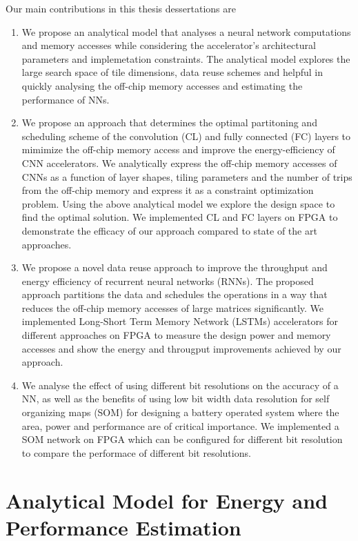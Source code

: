 \documentclass[a4paper,10pt]{article}
\begin{document}
Our main contributions in this thesis dessertations are
\begin{enumerate}
	\item We propose an analytical model that analyses a neural network computations and memory accesses while considering the accelerator's architectural parameters and implemetation constraints. The analytical model explores the large search space of tile dimensions, data reuse schemes and helpful in quickly analysing the off-chip memory accesses and estimating the performance of NNs.
	
	\item We propose an approach that determines the optimal partitoning and scheduling scheme of the convolution (CL) and fully connected (FC) layers to mimimize the off-chip memory access and improve the energy-efficiency of CNN accelerators. We analytically express the off-chip memory accesses of CNNs  as a function of layer shapes, tiling parameters and the number of trips from the off-chip memory and express it as a constraint optimization problem. Using the above analytical model we explore the design space to find the optimal solution. We implemented CL and FC layers on FPGA to demonstrate the efficacy of our approach compared to state of the art approaches.  
	
	\item We propose a novel data reuse approach to improve the throughput and energy efficiency of recurrent neural networks (RNNs). The proposed approach partitions the data and schedules the operations in a way that reduces the off-chip memory accesses of large matrices significantly. We implemented Long-Short Term Memory Network (LSTMs) accelerators for different approaches on FPGA to measure the design power and memory accesses and show the energy and througput improvements achieved by our approach.
	\item We analyse the effect of using different bit resolutions on the accuracy of a NN, as well as the benefits of using low bit width data resolution for self organizing maps (SOM) for designing a battery operated system where the area, power and performance are of critical importance. We implemented a SOM network on FPGA which can be configured for different bit resolution to compare the performace of different bit resolutions.
\end{enumerate}
\section{Analytical Model for Energy and Performance Estimation}
\end{document}
